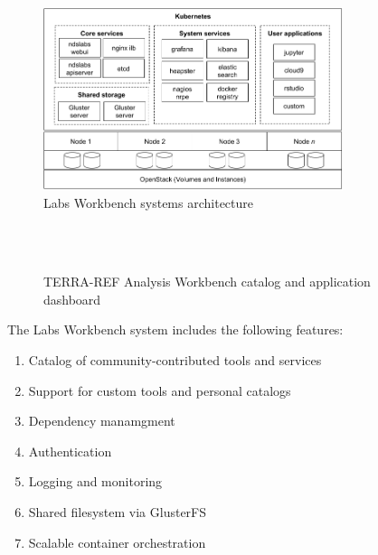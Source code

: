 \documentclass{sig-alternate}
\begin{document}
\begin{figure}[!ht]
\includegraphics[width=8.75cm]{architecture.png}
\caption{Labs Workbench systems architecture}
\label{fig.arch}
\end{figure}

\begin{figure}[!ht]
\\
\\
\caption{TERRA-REF Analysis Workbench catalog and application dashboard}
\label{fig.ui}
\end{figure}

The Labs Workbench system includes the following features:
\begin{enumerate}
\itemsep-0.2em
\item Catalog of community-contributed tools and services
\item Support for custom tools and personal catalogs
\item Dependency manamgment
\item Authentication
\item Logging and monitoring
\item Shared filesystem via GlusterFS
\item Scalable container orchestration
\end{enumerate}
\end{document}
